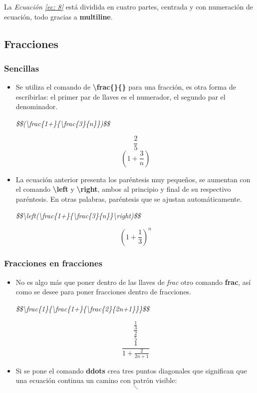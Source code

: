 La \textit{Ecuación \ref{ec: 8}} está dividida en cuatro partes, centrada y con numeración de ecuación, todo gracias a \textbf{multiline}.


\subsection{Fracciones}


\subsubsection{Sencillas}
\begin{itemize}
    \item Se utiliza el comando de \textbf{\textbackslash{frac\{\}\{\}}} para una fracción, es otra forma de escribirlas: el primer par de llaves es el numerador, el segundo par el denominador.
    \begin{center}
        \textit{\$\$(\textbackslash{frac\{1+\}\{\textbackslash{frac\{3\}\{n\}}\}})\$\$}
    \end{center}
    $$\frac{2}{5}$$
    $$(1+\frac{3}{n})$$
    \item La ecuación anterior presenta los paréntesis muy pequeños, se aumentan con el comando \textbf{\textbackslash{left}} y \textbf{\textbackslash{right}}, ambos al principio y final de su respectivo paréntesis. En otras palabras, paréntesis que se ajustan automáticamente.
    \begin{center}
        \textit{\$\$\textbackslash{left}(\textbackslash{frac\{1+\}\{\textbackslash{frac\{3\}\{n\}}\}}\textbackslash{right})\$\$}
    \end{center}
    $$\left(1+\frac{1}{3}\right)^n$$
\end{itemize}


\subsubsection{Fracciones en fracciones}
\begin{itemize}
    \item No es algo más que poner dentro de las llaves de \textit{frac} otro comando \textbf{frac}, así como se desee para poner fracciones dentro de fracciones.
    \begin{center}
        \textit{\$\$\textbackslash{frac\{1\}\{\textbackslash{frac\{1+\}\{\textbackslash{frac\{2\}\{2n+1\}}\}}\}}\$\$}
    \end{center}
    $$\frac{\frac{1}{3}}{\frac{2}{5}}$$
    $$\frac{1}{1+\frac{2}{2n+1}}$$
    \item Si se pone el comando \textbf{ddots} crea tres puntos diagonales que significan que una ecuación continua un camino con patrón visible:
    $$\ddots$$
\end{itemize}


